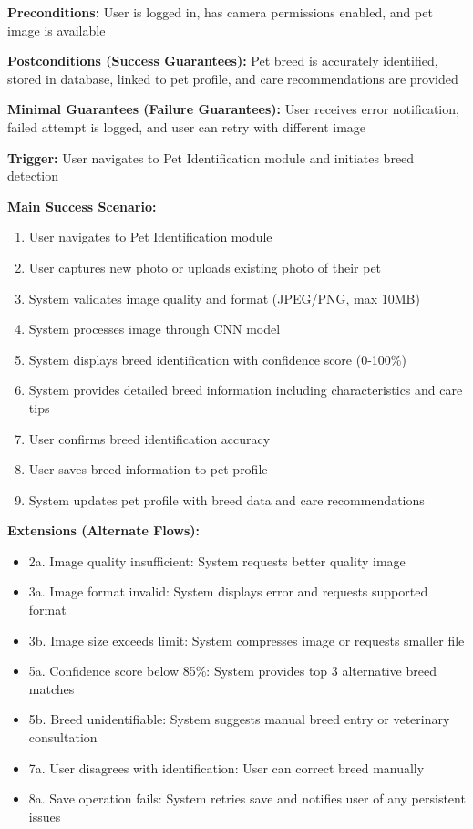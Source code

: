 \textbf{Preconditions:} User is logged in, has camera permissions enabled, and pet image is available

\textbf{Postconditions (Success Guarantees):} Pet breed is accurately identified, stored in database, linked to pet profile, and care recommendations are provided

\textbf{Minimal Guarantees (Failure Guarantees):} User receives error notification, failed attempt is logged, and user can retry with different image

\textbf{Trigger:} User navigates to Pet Identification module and initiates breed detection

\textbf{Main Success Scenario:}
\begin{enumerate}
    \item User navigates to Pet Identification module
    \item User captures new photo or uploads existing photo of their pet
    \item System validates image quality and format (JPEG/PNG, max 10MB)
    \item System processes image through CNN model
    \item System displays breed identification with confidence score (0-100\%)
    \item System provides detailed breed information including characteristics and care tips
    \item User confirms breed identification accuracy
    \item User saves breed information to pet profile
    \item System updates pet profile with breed data and care recommendations
\end{enumerate}

\textbf{Extensions (Alternate Flows):}
\begin{itemize}
    \item 2a. Image quality insufficient: System requests better quality image
    \item 3a. Image format invalid: System displays error and requests supported format
    \item 3b. Image size exceeds limit: System compresses image or requests smaller file
    \item 5a. Confidence score below 85\%: System provides top 3 alternative breed matches
    \item 5b. Breed unidentifiable: System suggests manual breed entry or veterinary consultation
    \item 7a. User disagrees with identification: User can correct breed manually
    \item 8a. Save operation fails: System retries save and notifies user of any persistent issues
\end{itemize}

